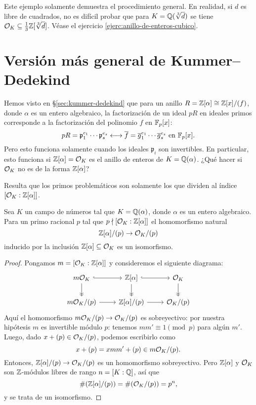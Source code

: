 Este ejemplo solamente demuestra el procedimiento general. En realidad, si $d$
es libre de cuadrados, no es difícil probar que para $K = \mathbb{Q} (\sqrt[3]{d})$ se
tiene $\mathcal{O}_K \subseteq \frac{1}{3}\mathbb{Z} [\sqrt[3]{d}]$. Véase el ejercicio
\ref{ejerc:anillo-de-enteros-cubico}.


\section{Versión más general de Kummer--Dedekind}

Hemos visto en \S\ref{sec:kummer-dedekind} que para un anillo
$R = \mathbb{Z} [\alpha] \cong \mathbb{Z}[x]/(f)$, donde $\alpha$ es un entero algebraico,
la factorización de un ideal $p R$ en ideales primos corresponde
a la factorización del polinomio $f$ en $\mathbb{F}_p [x]$:
\[ p R = \mathfrak{p}_1^{e_1} \cdots \mathfrak{p}_s^{e_s}
   \longleftrightarrow
   \overline{f} = \overline{g}_1^{e_1} \cdots \overline{g}_s^{e_s}
   \text{ en }\mathbb{F}_p [x]. \]
Pero esto funciona solamente cuando los ideales $\mathfrak{p}_i$ son
invertibles. En particular, esto funciona si $\mathbb{Z} [\alpha] = \mathcal{O}_K$ es el anillo
de enteros de $K = \mathbb{Q} (\alpha)$. ¿Qué hacer si $\mathcal{O}_K$ no es de la forma
$\mathbb{Z} [\alpha]$?

Resulta que los primos problemáticos son solamente los que dividen al índice
$[\mathcal{O}_K : \mathbb{Z} [\alpha]]$.

\begin{proposicion}
  Sea $K$ un campo de números tal que $K = \mathbb{Q} (\alpha)$, donde $\alpha$ es un
  entero algebraico. Para un primo racional $p$ tal que
  $p \nmid [\mathcal{O}_K : \mathbb{Z} [\alpha]]$ el homomorfismo natural
  $$\mathbb{Z} [\alpha]/(p) \to \mathcal{O}_K/(p)$$
  inducido por la inclusión $\mathbb{Z} [\alpha] \subseteq \mathcal{O}_K$ es un isomorfismo.

  \begin{proof}
    Pongamos $m = [\mathcal{O}_K : \mathbb{Z} [\alpha]]$ y consideremos el siguiente diagrama:
    \[ \begin{tikzcd}
      m \O_K \ar[hookrightarrow]{r}\ar[->>]{d} & \ZZ [\alpha]\ar[->>]{d} \ar[hookrightarrow]{r} & \O_K\ar[->>]{d} \\
      m \O_K/(p) \ar{r} & \ZZ [\alpha]/(p) \ar{r} & \O_K/(p)
    \end{tikzcd} \]
    Aquí el homomorfismo $m \mathcal{O}_K/(p) \to \mathcal{O}_K/(p)$ es sobreyectivo: por nuestra
    hipótesis $m$ es invertible módulo $p$: tenemos $m m' \equiv 1 \pmod{p}$
    para algún $m'$. Luego, dado $x + (p) \in \mathcal{O}_K/(p)$, podemos escribirlo
    como
    $$x + (p) = x m m' + (p) \in m\mathcal{O}_K/(p).$$
    Entonces, $\mathbb{Z} [\alpha]/(p) \to \mathcal{O}_K/(p)$ es un homomorfismo sobreyectivo.
    Pero $\mathbb{Z} [\alpha]$ y $\mathcal{O}_K$ son $\mathbb{Z}$-módulos libres de rango
    $n = [K:\mathbb{Q}]$, así que
    $$\# (\mathbb{Z} [\alpha]/(p)) = \# (\mathcal{O}_K/(p)) = p^n,$$
    y se trata de un isomorfismo.
  \end{proof}
\end{proposicion}

